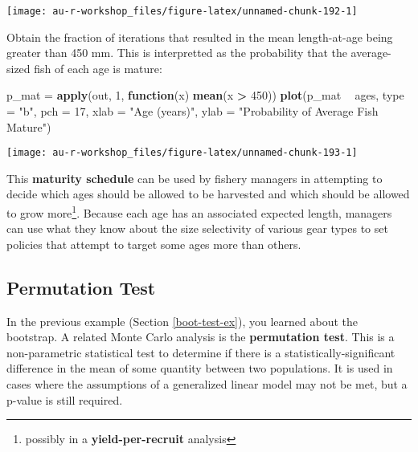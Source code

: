 \documentclass[]{book}
\newenvironment{Shaded}{\begin{snugshade}}{\end{snugshade}}
\newcommand{\KeywordTok}[1]{\textcolor[rgb]{0.13,0.29,0.53}{\textbf{#1}}}
\newcommand{\DataTypeTok}[1]{\textcolor[rgb]{0.13,0.29,0.53}{#1}}
\newcommand{\DecValTok}[1]{\textcolor[rgb]{0.00,0.00,0.81}{#1}}
\newcommand{\StringTok}[1]{\textcolor[rgb]{0.31,0.60,0.02}{#1}}
\newcommand{\ControlFlowTok}[1]{\textcolor[rgb]{0.13,0.29,0.53}{\textbf{#1}}}
\newcommand{\OperatorTok}[1]{\textcolor[rgb]{0.81,0.36,0.00}{\textbf{#1}}}
\newcommand{\NormalTok}[1]{#1}
\let\rmarkdownfootnote\footnote%
\def\footnote{\protect\rmarkdownfootnote}
\theoremstyle{definition}
\theoremstyle{definition}
\theoremstyle{definition}
\theoremstyle{remark}
\begin{document}
\begin{center}\texttt{[image: au-r-workshop\_files/figure-latex/unnamed-chunk-192-1]} \end{center}

Obtain the fraction of iterations that resulted in the mean
length-at-age being greater than 450 mm. This is interpretted as the
probability that the average-sized fish of each age is mature:

\begin{Shaded}
\begin{Highlighting}[]
\NormalTok{p_mat =}\StringTok{ }\KeywordTok{apply}\NormalTok{(out, }\DecValTok{1}\NormalTok{, }\ControlFlowTok{function}\NormalTok{(x) }\KeywordTok{mean}\NormalTok{(x }\OperatorTok{>}\StringTok{ }\DecValTok{450}\NormalTok{))}
\KeywordTok{plot}\NormalTok{(p_mat }\OperatorTok{~}\StringTok{ }\NormalTok{ages, }\DataTypeTok{type =} \StringTok{"b"}\NormalTok{, }\DataTypeTok{pch =} \DecValTok{17}\NormalTok{,}
     \DataTypeTok{xlab =} \StringTok{"Age (years)"}\NormalTok{, }\DataTypeTok{ylab =} \StringTok{"Probability of Average Fish Mature"}\NormalTok{)}
\end{Highlighting}
\end{Shaded}

\begin{center}\texttt{[image: au-r-workshop\_files/figure-latex/unnamed-chunk-193-1]} \end{center}

This \textbf{maturity schedule} can be used by fishery managers in
attempting to decide which ages should be allowed to be harvested and
which should be allowed to grow more\footnote{possibly in a
  \textbf{yield-per-recruit} analysis}. Because each age has an
associated expected length, managers can use what they know about the
size selectivity of various gear types to set policies that attempt to
target some ages more than others.

\subsection{Permutation Test}\label{perm-test-ex}

In the previous example (Section \ref{boot-test-ex}), you learned about
the bootstrap. A related Monte Carlo analysis is the \textbf{permutation
test}. This is a non-parametric statistical test to determine if there
is a statistically-significant difference in the mean of some quantity
between two populations. It is used in cases where the assumptions of a
generalized linear model may not be met, but a p-value is still
required.
\end{document}
